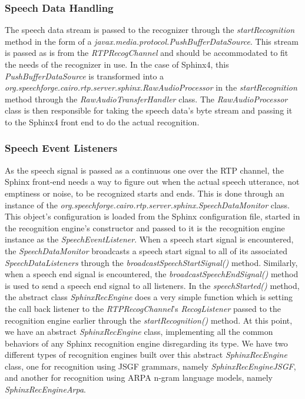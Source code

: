 \subsubsection{Speech Data Handling}
The speech data stream is passed to the recognizer through the \textit{startRecognition} method in the form of a \textit{javax.media.protocol.PushBufferDataSource}.
This stream is passed as is from the \textit{RTPRecogChannel} and should be accommodated to fit the needs of the recognizer in use.
In the case of Sphinx4, this \textit{PushBufferDataSource} is transformed into a \textit{org.speechforge.cairo.rtp.server.sphinx.RawAudioProcessor} in the \textit{startRecognition} method through the \textit{RawAudioTransferHandler} class.
The \textit{RawAudioProcessor} class is then responsible for taking the speech data's byte stream and passing it to the Sphinx4 front end to do the actual recognition.


\subsubsection{Speech Event Listeners}
As the speech signal is passed as a continuous one over the RTP channel, the Sphinx front-end needs a way to figure out when the actual speech utterance, not emptiness or noise, to be recognized starts and ends.
This is done through an instance of the \textit{org.speechforge.cairo.rtp.server.sphinx.SpeechDataMonitor} class.
This object's configuration is loaded from the Sphinx configuration file, started in the recognition engine's constructor and passed to it is the recognition engine instance as the \textit{SpeechEventListener}.
When a speech start signal is encountered, the \textit{SpeechDataMonitor} broadcasts a speech start signal to all of its associated \textit{SpeechDataListeners} through the \textit{broadcastSpeechStartSignal()} method. 
Similarly, when a speech end signal is encountered, the \textit{broadcastSpeechEndSignal()} method is used to send a speech end signal to all listeners.
In the \textit{speechStarted()} method, the abstract class \textit{SphinxRecEngine} does a very simple function which is setting the call back listener to the \textit{RTPRecogChannel}'s \textit{RecogListener} passed to the recognition engine earlier through the \textit{startRecognition()} method.
At this point, we have an abstract \textit{SphinxRecEngine} class, implementing all the common behaviors of any Sphinx recognition engine disregarding its type.
We have two different types of recognition engines built over this abstract \textit{SphinxRecEngine} class, one for recognition using JSGF grammars, namely \textit{SphinxRecEngineJSGF}, and another for recognition using ARPA n-gram language models, namely \textit{SphinxRecEngineArpa}.

